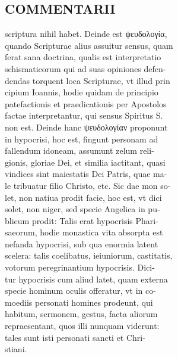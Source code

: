 \documentclass{article}
\begin{document}
\begin{pages}
\section*{COMMENTARII \\
                }scriptura nihil habet. Deinde est ψευδολογία, \\
                quando Scripturae alius assuitur sensus, quam \\
                ferat sana doctrina, qualis est interpretatio \\
                schismaticorum qui ad suas opiniones defen- \\
                dendas torquent loca Scripturae, vt illud prin \\
                cipium Ioannis, hodie quidam de principio \\
                patefactionis et praedicationis per Apostolos \\
                factae interpretantur, qui sensus Spiritus S. \\
                non est. Deinde hanc ψευδολογίαν proponunt \\
                in hypocrisi, hoc est, fingunt personam ad \\
                fallendum idoneam, assumunt zelum reli- \\
                gionis, gloriae Dei, et similia iactitant, quasi \\
                vindices sint maiestatis Dei Patris, quae ma- \\
                le tribuatur filio Christo, etc. Sic dae mon so- \\
                let, non natiua prodit facie, hoc est, vt dici \\
                solet, non niger, sed specie Angelica in pu- \\
                blicum prodit: Talis erat hypocrisis Phari- \\
                saeorum, hodie monastica vita absorpta est \\
                nefanda hypocrisi, sub qua enormia latent \\
                scelera: talis coelibatus, ieiuniorum, castitatis, \\
                votorum peregrinantium hypocrisis. Dici- \\
                tur hypocrisis cum aliud latet, quam externa \\
                specie hominum oculis offeratur, vt in co- \\
                moediis personati homines prodeunt, qui \\
                habitum, sermonem, gestus, facta aliorum \\
                repraesentant, quos illi nunquam viderunt: \\
                tales sunt isti personati sancti et Chri- \\
                stiani. \\
                

\end{pages}
\end{document}

